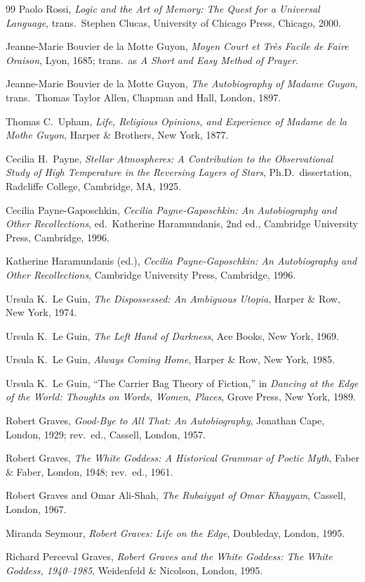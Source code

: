 \documentclass[11pt]{article}
\begin{document}
\begin{thebibliography}{99}
Paolo Rossi,
\emph{Logic and the Art of Memory: The Quest for a Universal Language},
trans.\ Stephen Clucas,
University of Chicago Press, Chicago, 2000.

Jeanne-Marie Bouvier de la Motte Guyon,
\emph{Moyen Court et Tr\`es Facile de Faire Oraison},
Lyon, 1685;
trans.\ as \emph{A Short and Easy Method of Prayer}.

Jeanne-Marie Bouvier de la Motte Guyon,
\emph{The Autobiography of Madame Guyon},
trans.\ Thomas Taylor Allen,
Chapman and Hall, London, 1897.

Thomas C.\ Upham,
\emph{Life, Religious Opinions, and Experience of Madame de la Mothe Guyon},
Harper \& Brothers, New York, 1877.

Cecilia H.\ Payne,
\emph{Stellar Atmospheres: A Contribution to the Observational Study of High Temperature in the Reversing Layers of Stars},
Ph.D.\ dissertation, Radcliffe College, Cambridge, MA, 1925.

Cecilia Payne-Gaposchkin,
\emph{Cecilia Payne-Gaposchkin: An Autobiography and Other Recollections},
ed.\ Katherine Haramundanis,
2nd ed., Cambridge University Press, Cambridge, 1996.

Katherine Haramundanis (ed.),
\emph{Cecilia Payne-Gaposchkin: An Autobiography and Other Recollections},
Cambridge University Press, Cambridge, 1996.

Ursula K.\ Le Guin,
\emph{The Dispossessed: An Ambiguous Utopia},
Harper \& Row, New York, 1974.

Ursula K.\ Le Guin,
\emph{The Left Hand of Darkness},
Ace Books, New York, 1969.

Ursula K.\ Le Guin,
\emph{Always Coming Home},
Harper \& Row, New York, 1985.

Ursula K.\ Le Guin,
``The Carrier Bag Theory of Fiction,''
in \emph{Dancing at the Edge of the World: Thoughts on Words, Women, Places},
Grove Press, New York, 1989.

Robert Graves,
\emph{Good-Bye to All That: An Autobiography},
Jonathan Cape, London, 1929;
rev.\ ed., Cassell, London, 1957.

Robert Graves,
\emph{The White Goddess: A Historical Grammar of Poetic Myth},
Faber \& Faber, London, 1948;
rev.\ ed., 1961.

Robert Graves and Omar Ali-Shah,
\emph{The Rubaiyyat of Omar Khayyam},
Cassell, London, 1967.

Miranda Seymour,
\emph{Robert Graves: Life on the Edge},
Doubleday, London, 1995.

Richard Perceval Graves,
\emph{Robert Graves and the White Goddess: The White Goddess, 1940--1985},
Weidenfeld \& Nicolson, London, 1995.

\end{thebibliography}
\end{document}

